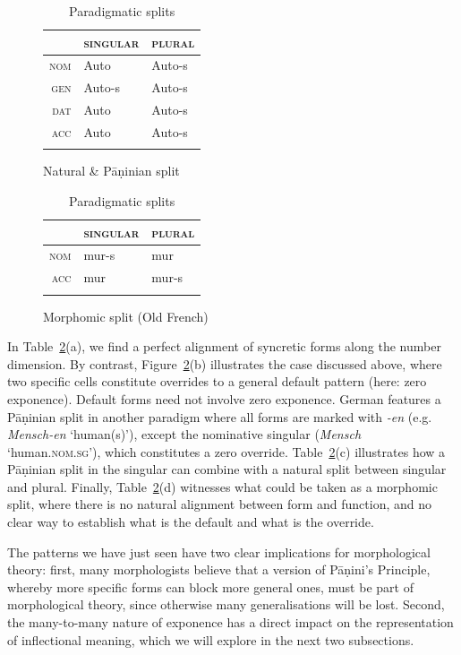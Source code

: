 \documentclass[output=paper
	        ,collection
	        ,collectionchapter
 	        ,biblatex
                ,babelshorthands
                ,newtxmath
                ,draftmode
                ,colorlinks, citecolor=brown
]{./langsci/langscibook}
\begin{document}
{\begin{table}[htb]
  \begin{subfigure}{.45\textwidth}
      \begin{tabular}{r|ll}
        \lsptoprule
        & \textsc{singular} & \textsc{plural}\\
        \midrule
        \textsc{nom} & Auto & Auto-s\\
        \textsc{gen} & Auto-s & Auto-s\\
        \textsc{dat} & Auto & Auto-s\\
        \textsc{acc} & Auto & Auto-s\\
        \lspbottomrule
      \end{tabular}
      \caption{Natural \& Pāṇinian split}
    \end{subfigure}
  \begin{subfigure}{.45\textwidth}
    \begin{tabular}{r|ll}
      \lsptoprule
      & \textsc{singular} & \textsc{plural}\\
      \midrule
      \textsc{nom} & mur-s & mur\\
      \textsc{acc} & mur & mur-s\\
      \lspbottomrule
    \end{tabular}

    \caption{Morphomic split (Old French)}
  \end{subfigure}
  
  
  \caption{Paradigmatic splits}
  \label{tab:ParaSplit}
\end{table}

In Table~\ref{tab:ParaSplit}(a), we find a perfect alignment of
syncretic forms along the number dimension. By contrast,
Figure~\ref{tab:ParaSplit}(b) illustrates the case discussed above,
where two specific cells constitute overrides to a general default
pattern (here: zero exponence). Default forms need not involve zero
exponence. German features a Pāṇinian split in another paradigm where
all forms are marked with \textit{-en} (e.g. \textit{Mensch-en}
`human(s)'), except the nominative singular (\textit{Mensch}
`human\textsc{.nom.sg}'), which constitutes a zero
override. Table~\ref{tab:ParaSplit}(c) illustrates how a Pāṇinian split
in the singular can combine with a natural split between singular and
plural. Finally, Table~\ref{tab:ParaSplit}(d) witnesses what could be
taken as a morphomic split, where there is no natural alignment
between form and function, and no clear way to establish what is the
default and what is the override.

The patterns we have just seen have two clear implications for
morphological theory: first, many morphologists believe that
a version of Pāṇini's Principle, whereby more specific forms can block
more general ones, must be part of morphological theory, since
otherwise many generalisations will be lost. 
Second, the many-to-many nature of exponence has a direct impact on
the representation of inflectional meaning, which we will explore in
the next two subsections. 

}
\end{document}
